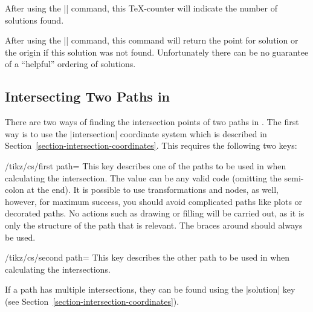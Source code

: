 \begin{command}{\pgfintersectionsolutions}
  After using the |\pgfintersectionofpaths| command, this \TeX-counter
  will indicate the number of solutions found.
\end{command}

\begin{command}{\pgfpointintersectionsolution{}}
  After using the |\pgfintersectionofpaths| command, this command
  will return the point for solution  or the origin
  if this solution was not found. Unfortunately
  there can be no guarantee of a ``helpful'' ordering of solutions.
\end{command}

\subsection{Intersecting Two Paths in \tikzname}

  There are two ways of finding the intersection points of two paths 
  in \tikzname. The first way is to use the |intersection| 
  coordinate system which is described in 
  Section~\ref{section-intersection-coordinates}. This requires
  the following two keys:

\begin{key}{/tikz/cs/first path=}
  This key describes one of the paths to be used in when calculating
  the intersection. The value  can be any valid \tikzname{}
  code (omitting the semi-colon at the end). It is possible to use
  transformations and nodes, as well, however, for maximum 
  success, you should avoid complicated paths like plots or 
  decorated paths. No actions such as drawing or filling will be
  carried out, as it is only the structure of the path that is
  relevant. The braces around  should always be
  used.
\end{key}

\begin{key}{/tikz/cs/second path=}
  This key describes the other path to be used in when calculating
  the intersections.
\end{key}
  
  If a path has multiple intersections, they can be found
  using the |solution| key (see 
  Section~\ref{section-intersection-coordinates}).
  
\begin{codeexample}[]
\end{codeexample}

